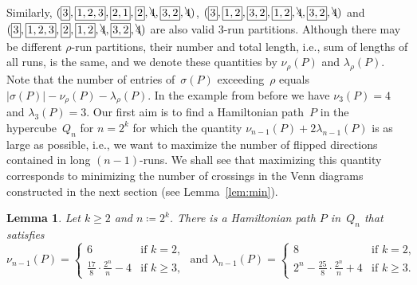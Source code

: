\documentclass[11pt]{article}
\newtheorem{lemma}[theorem]{Lemma}
\newcommand{\defi}[1]{\textcolor{defblue}{\emph{#1}}}
\newcommand{\ass}{\coloneqq}
\newcommand*{\mybox}[1]{%
  \framebox{\raisebox{0pt}[0.45\baselineskip][0.05\baselineskip]{%
    $\!#1\!$}}}
\begin{document}
Similarly, $(\mybox{3},\mybox{1,2,3},\mybox{2,1},\mybox{2},\bcancel{4},\mybox{3,2},\bcancel{4})$, $(\mybox{3},\mybox{1,2},\mybox{3,2},\mybox{1,2},\bcancel{4},\mybox{3,2},\bcancel{4})$ and $(\mybox{3},\mybox{1,2,3},\mybox{2},\mybox{1,2},\bcancel{4},\mybox{3,2},\bcancel{4})$ are also valid 3-run partitions.
%
Although there may be different $\rho$-run partitions, their number and total length, i.e., sum of lengths of all runs, is the same, and we denote these quantities by \defi{$\nu_\rho(P)$} and \defi{$\lambda_\rho(P)$}.
Note that the number of entries of~$\sigma(P)$ exceeding~$\rho$ equals $|\sigma(P)|-\nu_\rho(P)-\lambda_\rho(P)$.
In the example from before we have $\nu_3(P)=4$ and $\lambda_3(P)=3$.
%
Our first aim is to find a Hamiltonian path~$P$ in the hypercube~$Q_n$ for $n=2^k$ for which the quantity $\nu_{n-1}(P)+2\lambda_{n-1}(P)$ is as large as possible, i.e., we want to maximize the number of flipped directions contained in long $(n-1)$-runs.
We shall see that maximizing this quantity corresponds to minimizing the number of crossings in the Venn diagrams constructed in the next section (see Lemma~\ref{lem:min}).
%
\begin{lemma}
\label{lem:run}
Let $k\geq 2$ and $n\ass 2^k$.
There is a Hamiltonian path $P$ in~$Q_n$ that satisfies
\[ \nu_{n-1}(P)=\begin{cases}
               6& \text{if } k=2, \\
               \frac{17}{8}\cdot\frac{2^n}{n}-4 & \text{if } k\ge 3,
               \end{cases} \text{   and   }
\lambda_{n-1}(P)=\begin{cases}
                 8 & \text{if } k=2, \\
                 2^n-\frac{25}{8}\cdot \frac{2^n}{n}+4 & \text{if } k\ge 3.
                 \end{cases} \]
\end{lemma}
%
\end{document}
